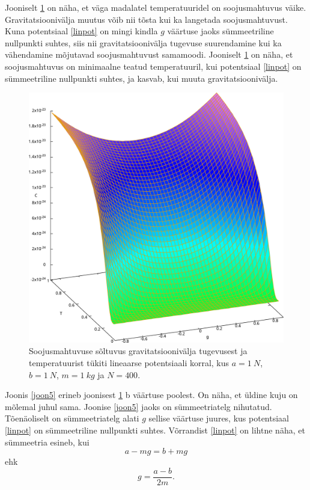 \documentclass{trkut}%
\begin{document}
Jooniselt \ref{joon1} on näha, et väga madalatel temperatuuridel on soojusmahtuvus väike.
Gravitatsioonivälja muutus võib nii tõsta kui ka langetada soojusmahtuvust.
Kuna potentsiaal \eqref{linpot} on mingi kindla $g$ väärtuse jaoks sümmeetriline nullpunkti suhtes, siis nii gravitatsioonivälja tugevuse suurendamine kui ka vähendamine mõjutavad soojusmahtuvust samamoodi.
Jooniselt \ref{joon1} on näha, et soojusmahtuvus on minimaalne teatud temperatuuril, kui potentsiaal \eqref{linpot} on sümmeetriline nullpunkti suhtes, ja kasvab, kui muuta gravitatsioonivälja.

\begin{figure}[htb!]
    \includegraphics[width=\textwidth]{maxima/m1a1b1T0_1S400_2.pdf}
    \caption{Soojusmahtuvuse sõltuvus gravitatsioonivälja tugevusest ja temperatuurist tükiti lineaarse potentsiaali korral, kus $a=\SI{1}{N}$, $b=\SI{1}{N}$, $m=\SI{1}{kg}$ ja $N=400$.}
    \label{joon1}
\end{figure}

Joonis \ref{joon5} erineb joonisest \ref{joon1} b väärtuse poolest.
On näha, et üldine kuju on mõlemal juhul sama.
Joonise \ref{joon5} jaoks on sümmeetriatelg nihutatud.
Tõenäoliselt on sümmeetriatelg alati $g$ sellise väärtuse juures, kus potentsiaal \eqref{linpot} on sümmeetriline nullpunkti suhtes.
Võrrandist \eqref{linpot} on lihtne näha, et sümmeetria esineb, kui
\begin{equation}
    a-mg=b+mg
\end{equation}
ehk
\begin{equation}
    g=\frac{a-b}{2m}.
\end{equation}
\end{document}
